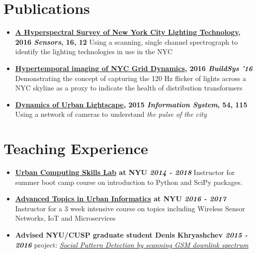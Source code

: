 \documentclass[letterpaper,11pt]{article}
\newcommand{\resumePubItem}[3]{
	\item\small{
		\textbf{#1 \null\hfill{#2}}{#3} \vspace{-2pt}
	}
}
\newcommand{\resumePublicationItem}[3]{\resumePubItem{#1}{#2}\newline{#3}\vspace{-4pt}}
\newcommand{\resumeSubHeadingListStart}{\begin{itemize}[leftmargin=*]}
\newcommand{\resumeSubHeadingListEnd}{\end{itemize}}
\begin{document}
\section{Publications}
  \resumeSubHeadingListStart
    \resumePublicationItem{\href{http://www.mdpi.com/1424-8220/16/12/2047/html}{A Hyperspectral Survey of New York City Lighting Technology}, 2016}{\textit{Sensors}, 16, 12} 
    {Using a scanning, single channel spectrograph to identify the lighting technologies in use in the NYC}
    \resumePublicationItem{\href{http://dl.acm.org/citation.cfm?id=2993570}{Hypertemporal imaging of NYC Grid Dynamics}, 2016}{\textit{BuildSys '16}}  
    {Demonstrating the concept of capturing the 120 Hz flicker of lights across a NYC skyline as a proxy to indicate the health of distribution transformers}
    \resumePublicationItem{\href{http://www.sciencedirect.com/science/article/pii/S0306437915001167}{Dynamics of Urban Lightscape},  2015}{\textit{Information System}, 54, 115}    
    {Using a network of cameras to understand \textit{the pulse of the city}}
  \resumeSubHeadingListEnd

\section{Teaching Experience}
  \resumeSubHeadingListStart
    \resumePublicationItem{ \href{https://sharmamohit.com/\#teaching}{\textbf{Urban Computing Skills Lab}} at NYU}{\textit{2014 - 2018}}
    {Instructor for summer boot camp course on introduction to Python and SciPy packages.}
    \resumePublicationItem{ \href{https://sharmamohit.com/\#teaching}{\textbf{Advanced Topics in Urban Informatics}} at NYU}{\textit{2016 - 2017}}
    {Instructor for a 3 week intensive course on topics including Wireless Sensor Networks, IoT and Microservices}
    \resumePublicationItem{Advised NYU/CUSP graduate student Denis Khryashchev}{\textit{2015 - 2016}}{project: \href{https://www.overleaf.com/read/ssrzkqkznpkw}{\textit{Social Pattern Detection by scanning GSM downlink spectrum}}}
  \resumeSubHeadingListEnd

%


\end{document}
